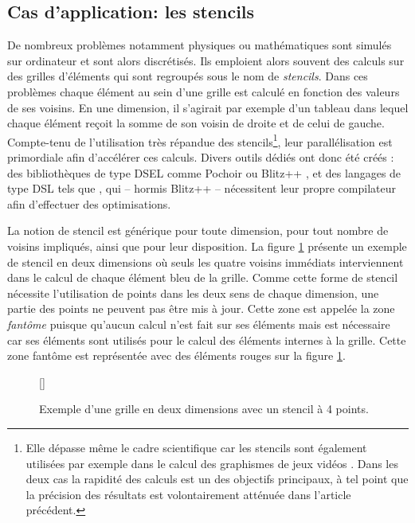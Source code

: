 \subsection{Cas d'application: les stencils}
\label{sec:stencil_base}

De nombreux problèmes notamment physiques ou mathématiques sont simulés sur ordinateur et sont alors discrétisés. Ils emploient alors souvent des calculs sur des grilles d'éléments qui sont regroupés sous le nom de \emph{stencils}. Dans ces problèmes chaque élément au sein d'une grille est calculé en fonction des valeurs de ses voisins. En une dimension, il s'agirait par exemple d'un tableau dans lequel chaque élément reçoit la somme de son voisin de droite et de celui de gauche. Compte-tenu de l'utilisation très répandue des stencils\footnote{Elle dépasse même le cadre scientifique car les stencils sont également utilisées par exemple dans le calcul des graphismes de jeux vidéos \cite{Art15}. Dans les deux cas la rapidité des calculs est un des objectifs principaux, à tel point que la précision des résultats est volontairement atténuée dans l'article précédent.}, leur parallélisation est primordiale afin d'accélérer ces calculs. Divers outils dédiés ont donc été créés : des bibliothèques de type DSEL comme \textsf{Pochoir} \cite{Art18} ou \textsf{Blitz++} \cite{Art5}, et des langages de type DSL tels que \cite{Art19}, qui -- hormis \textsf{Blitz++} -- nécessitent leur propre compilateur afin d'effectuer des optimisations.  

La notion de stencil est générique pour toute dimension, pour tout nombre de voisins impliqués, ainsi que pour leur disposition. La figure \ref{fig:stencil_base} présente un exemple de stencil en deux dimensions où seuls les quatre voisins immédiats interviennent dans le calcul de chaque élément bleu de la grille. Comme cette forme de stencil nécessite l'utilisation de points dans les deux sens de chaque dimension, une partie des points ne peuvent pas être mis à jour. Cette zone est appelée la zone \emph{fantôme} puisque qu'aucun calcul n'est fait sur ses éléments mais est nécessaire car ses éléments sont utilisés pour le calcul des éléments internes à la grille. Cette zone fantôme est représentée avec des éléments rouges sur la figure \ref{fig:stencil_base}.

\begin{figure}[!h]
[\FBwidth]
{\caption{Exemple d'une grille en deux dimensions avec un stencil à 4 points.}\label{fig:stencil_base}}
{}
\end{figure}

